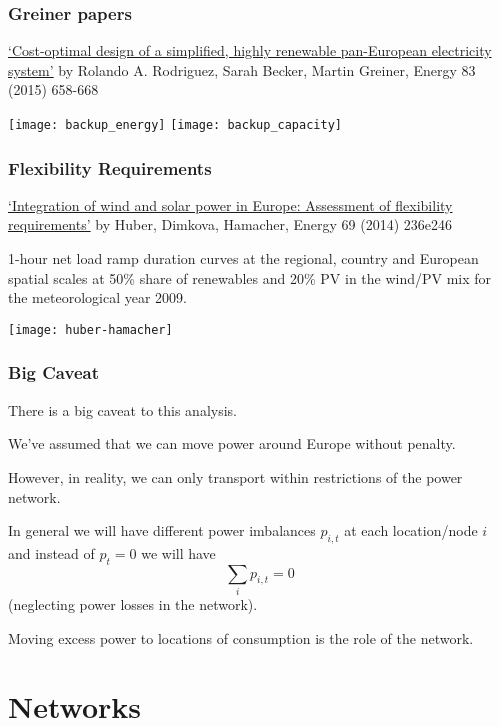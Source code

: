 \documentclass[10pt,aspectratio=169,dvipsnames]{beamer}
\begin{document}
\begin{frame}
  \frametitle{Greiner papers}


  \href{http://www.sciencedirect.com/science/article/pii/S0360544215002212}
  {`Cost-optimal design of a simplified, highly renewable pan-European
  electricity system'} by
  Rolando A. Rodriguez, Sarah Becker, Martin Greiner,
  Energy 83 (2015) 658-668

  \centering
  \texttt{[image: backup\_energy]}
  \texttt{[image: backup\_capacity]}
\end{frame}


\begin{frame}
  \frametitle{Flexibility Requirements}

  \href{http://www.sciencedirect.com/science/article/pii/S0360544214002680}{`Integration of wind and solar power in Europe: Assessment of flexibility requirements'} by Huber, Dimkova, Hamacher,
Energy 69 (2014) 236e246

  1-hour net load ramp duration curves at the regional, country and European
  spatial scales at 50\% share of renewables and 20\% PV in the wind/PV mix for the
  meteorological year 2009.

  \centering
  \texttt{[image: huber-hamacher]}


\end{frame}




\begin{frame}
  \frametitle{Big Caveat}

  There is a big caveat to this analysis.

  We've assumed that we can move power around Europe without penalty.

  However, in reality, we can only transport within restrictions of the power network.

  In general we will have different power imbalances $p_{i,t}$ at each
  location/node $i$ and instead of $p_t = 0$ we will have
  \begin{equation*}
    \sum_i p_{i,t} = 0
  \end{equation*}
  (neglecting power losses in the network).

  Moving excess power to locations of consumption is the role of the network.


\end{frame}

\section{Networks}
\end{document}
